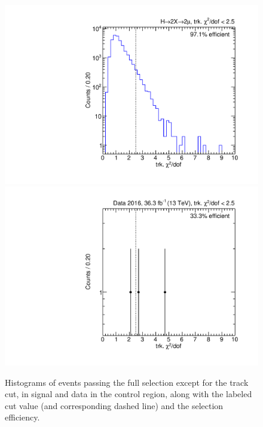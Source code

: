 \begin{figure}[p]
  \centering
  \includegraphics[width=\DSquareWidth]{figures/displaced/NM1_2Mu2J_trkChi2.pdf}
  \hspace*{-2em}
  \includegraphics[width=\DSquareWidth]{figures/displaced/NM1_Data_trkChi2.pdf}
  \caption[Histograms of events passing the full selection except for the track \normchisq cut in \twoMu signal and data.]{Histograms of events passing the full selection except for the track \normchisq cut, in  \twoMu signal and  data in the control region, along with the labeled cut value (and corresponding dashed line) and the selection efficiency.}
  \label{fig:dd:NM1_trkChi2}
\end{figure}


